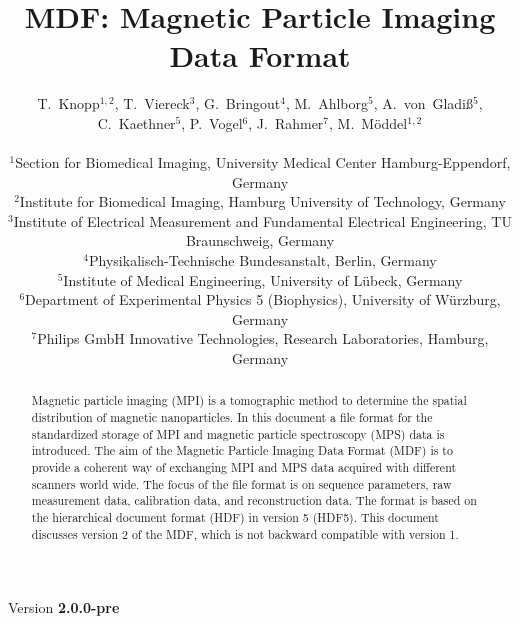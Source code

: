 \documentclass[landscape,a4paper]{article} %
\begin{document}
\title{MDF: Magnetic Particle Imaging Data Format}
\newcommand{\version}{2.0.0-pre}

\author{
T.~Knopp$^{1,2}$, T.~Viereck$^3$, G.~Bringout$^4$, M.~Ahlborg$^5$, A.~von~Gladi\ss$^5$, C.~Kaethner$^5$, P.~Vogel$^6$, J.~Rahmer$^7$, M.~M\"oddel$^{1,2}$ \\ \\
$^1$Section for Biomedical Imaging, University Medical Center Hamburg-Eppendorf, Germany\\
$^2$Institute for Biomedical Imaging, Hamburg University of Technology, Germany\\
$^3$Institute of Electrical Measurement and Fundamental Electrical Engineering, TU Braunschweig, Germany\\
$^4$Physikalisch-Technische Bundesanstalt, Berlin, Germany\\
$^5$Institute of Medical Engineering, University of  Lübeck, Germany\\
$^6$Department of Experimental Physics 5 (Biophysics), University of Würzburg, Germany\\
$^7$Philips GmbH Innovative Technologies, Research Laboratories, Hamburg, Germany
}

\maketitle
\begin{center}
Version \textbf{\version}
\end{center}

\begin{abstract}
Magnetic particle imaging (MPI) is a tomographic method to determine the spatial distribution of magnetic nanoparticles. In this document a file format for the standardized storage of MPI and magnetic particle spectroscopy (MPS) data is introduced. The aim of the Magnetic Particle Imaging Data Format (MDF) is to provide a coherent way of exchanging MPI and MPS data acquired with different scanners world wide. The focus of the file format is on sequence parameters, raw measurement data, calibration data, and reconstruction data. The format is based on the hierarchical document format (HDF) in version 5 (HDF5). This document discusses version 2 of the MDF, which is not backward compatible with version 1.
\end{abstract}
\end{document}

